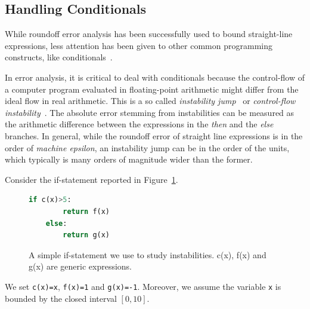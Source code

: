 %
%  
%  
%
%
%
%

\subsection{Handling Conditionals}
%
%
While roundoff error analysis has been successfully used to bound straight-line expressions, less attention has been given to other common programming constructs, like conditionals~\cite{precisa, fluctuat}.
%

In error analysis, it is critical to deal with conditionals because the control-flow of a computer program evaluated in floating-point arithmetic might differ from the ideal flow in real arithmetic.
%
%
This is a so called \emph{instability jump}~\cite{satire} or \emph{control-flow instability}~\cite{unstable}.
%
The absolute error stemming from instabilities can be measured as the arithmetic difference between the expressions in the \emph{then} and the \emph{else} branches.
%
In general, while the roundoff error of straight line expressions is in the order of \emph{machine epsilon}, an instability jump can be in the order of the units, which typically is many orders of magnitude wider than the former.
%

Consider the if-statement reported in Figure~\ref{fig:ifstatement}. 
%
\begin{figure}[h!]
	\begin{lstlisting}[frame=single, language=Python]
	if c(x)>5:
		return f(x)
	else:
		return g(x)	
	\end{lstlisting}
	\caption{A simple if-statement we use to study instabilities. c(x), f(x) and g(x) are generic expressions.}\label{fig:ifstatement}
\end{figure}
%

We set \lstinline{c(x)=x}, \lstinline{f(x)=1} and \lstinline{g(x)=-1}.
%
Moreover, we assume the variable \lstinline{x} is bounded by the closed interval $[0,10]$.

